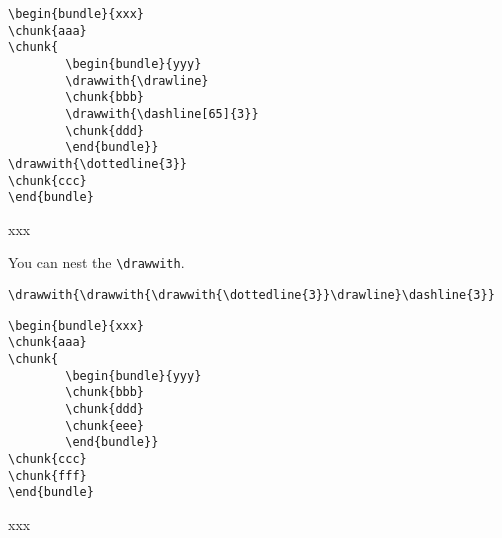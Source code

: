 \noindent\begin{minipage}{0.6\textwidth}
\begin{verbatim}
\begin{bundle}{xxx}
\chunk{aaa}
\chunk{
        \begin{bundle}{yyy}
        \drawwith{\drawline}
        \chunk{bbb}
        \drawwith{\dashline[65]{3}}
        \chunk{ddd}
        \end{bundle}}
\drawwith{\dottedline{3}}
\chunk{ccc}
\end{bundle}
\end{verbatim}
\end{minipage}\begin{minipage}{0.4\textwidth}
\begin{bundle}{xxx}
\end{bundle}
\end{minipage}

You can nest the \verb|\drawwith|. 

\begin{verbatim}
\drawwith{\drawwith{\drawwith{\dottedline{3}}\drawline}\dashline{3}}
\end{verbatim}
\noindent\begin{minipage}{0.6\textwidth}
\begin{verbatim}
\begin{bundle}{xxx}
\chunk{aaa}
\chunk{
        \begin{bundle}{yyy}
        \chunk{bbb}
        \chunk{ddd}
        \chunk{eee}
        \end{bundle}}
\chunk{ccc}
\chunk{fff}
\end{bundle}
\end{verbatim}
\end{minipage}\begin{minipage}{0.4\textwidth}
\begin{bundle}{xxx}
\end{bundle}
\end{minipage}

